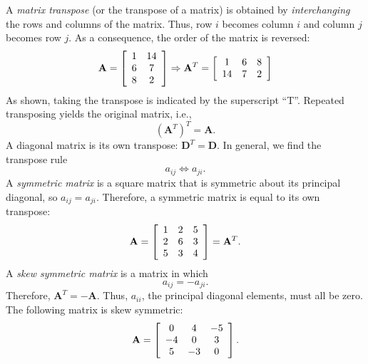    A \emph{matrix transpose} (or the transpose of a matrix) is obtained by \emph{interchanging} the rows and columns 
of the matrix. Thus, row $i$ becomes column $i$ and column $j$ becomes row $j$. As a consequence, the order of the matrix 
is reversed:
\begin{equation}
	\index{Matrix!transpose}
	\index{Transpose of matrix}
\mathbf{A} = \left[     \begin{array}{cc}
1 & 14 \\
6 & 7 \\
8 & 2 
\end{array} \right]
 \Rightarrow
\mathbf{A}^T = \left[ \begin{array}{ccr}
1 & 6 & 8 \\
14 & 7 & 2 \end{array} \right]
\end{equation}
As shown, taking the transpose is indicated by the superscript ``T''.
Repeated transposing yields the original matrix, i.e.,
\begin{equation}
(\mathbf{A}^T)^T = \mathbf{A}.
\end{equation} 
A diagonal matrix is its own transpose: $\mathbf{D}^T = \mathbf{D}$. In general, we find the transpose rule
\begin{equation}
a_{ij} \Leftrightarrow a_{ji}.
\end{equation}	 
   A \emph{symmetric matrix} is a square matrix that is symmetric about its principal diagonal, so 
$a_{ij} = a_{ji}$.  Therefore, a symmetric matrix is equal to its own transpose:
\begin{equation}
	\index{Matrix!symmetric}
	\index{Symmetric matrix}
\mathbf{A} = \left[ \begin{array}{ccc} 
1 & 2 & 5 \\
2 & 6 & 3 \\
5 & 3 & 4
\end{array}
\right]
= \mathbf{A}^T .
\end{equation} 	 
A \emph{skew symmetric matrix} is a matrix in which
\begin{equation}
a_{ij} = -a_{ji}.
\end{equation}
Therefore, $\mathbf{A}^T = - \mathbf{A}$.  Thus, $a_{ii}$, the principal diagonal elements, must all be zero.
The following matrix is skew symmetric:
\begin{equation}
	\index{Matrix!skew symmetric}
	\index{Skew symmetric matrix}
\mathbf{A} = \left[ \begin{array}{ccc} 
0 & 4 & -5 \\
-4 & 0 & 3 \\
5 & -3 & 0
\end{array}
\right].
\end{equation}

